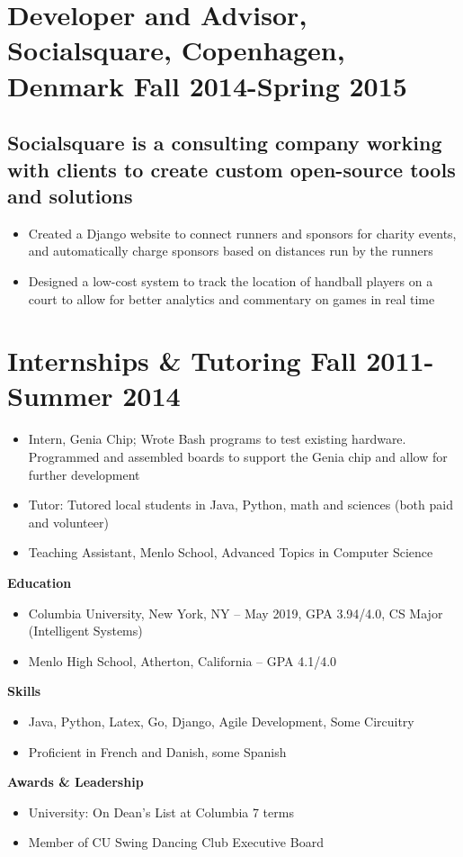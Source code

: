 \documentclass{article}
\begin{document}
\section*{\textbf{Developer and Advisor, Socialsquare, Copenhagen, Denmark \hfill Fall 2014-Spring 2015}}
\subsection*{Socialsquare is a consulting company working with clients to create custom open-source tools and solutions}
\begin{itemize}[noitemsep]
    \item Created a Django website to connect runners and sponsors for charity events, and automatically charge sponsors based on distances run by the runners
    \item Designed a low-cost system to track the location of handball players on a court to allow for better analytics and commentary on games in real time
\end{itemize}

\section*{\textbf{Internships \& Tutoring \hfill Fall 2011- Summer 2014
}}
\begin{itemize}[noitemsep]
    \item Intern, Genia Chip; Wrote Bash programs to test existing hardware. Programmed and assembled boards to support the Genia chip and allow for further development
    \item Tutor: Tutored local students in Java, Python, math and sciences (both paid and volunteer)
    \item Teaching Assistant, Menlo School, Advanced Topics in Computer Science
\end{itemize}

\noindent
{\large\textbf{Education}}
\begin{itemize}[noitemsep]
    \item Columbia University, New York, NY -- May 2019, GPA 3.94/4.0, CS Major (Intelligent Systems)
    \item Menlo High School, Atherton, California -- GPA 4.1/4.0
\end{itemize}

\noindent
{\large\textbf{Skills}}
\begin{itemize}[noitemsep]
    \item Java, Python, Latex, Go, Django, Agile Development, Some Circuitry
    \item Proficient in French and Danish, some Spanish
\end{itemize}
\noindent
{\large\textbf{Awards \& Leadership}}
\begin{itemize}[noitemsep]
    \item University: On Dean’s List at Columbia 7 terms
    \item Member of CU Swing Dancing Club Executive Board

\end{itemize}
\end{document}
